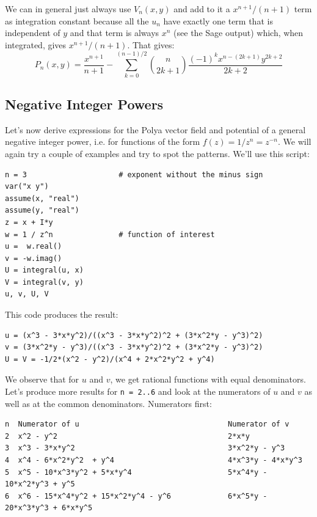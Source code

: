 \documentclass[12pt]{article}
\begin{document}
\medskip
We can in general just always use $V_n(x,y)$ and add to it a $x^{n+1}/(n+1)$ term as integration constant because all the $u_n$ have exactly one term that is independent of $y$ and that term is always $x^n$ (see the Sage output) which, when integrated, gives $x^{n+1}/(n+1)$. That gives:
\begin{equation}
\label{Eq:PolyaPotentialPositivePowers}	
\boxed{	
	P_n(x,y) = \frac{x^{n+1}}{n+1} 
	-\sum_{k=0}^{(n-1)/2} \binom{n}{2k+1} \frac{(-1)^k x^{n-(2k+1)} y^{2k+2}}{2k+2}
}
\end{equation}

\subsection{Negative Integer Powers}
Let's now derive expressions for the Polya vector field and potential of a general negative integer power, i.e. for functions of the form $f(z) = 1/z^n = z^{-n}$. We will again try a couple of examples and try to spot the patterns. We'll use this script:
\begin{verbatim}
n = 3                     # exponent without the minus sign
var("x y")
assume(x, "real")
assume(y, "real")
z = x + I*y
w = 1 / z^n               # function of interest
u =  w.real() 
v = -w.imag()
U = integral(u, x)
V = integral(v, y)
u, v, U, V
\end{verbatim}
This code produces the result:
\begin{verbatim}
u = (x^3 - 3*x*y^2)/((x^3 - 3*x*y^2)^2 + (3*x^2*y - y^3)^2)
v = (3*x^2*y - y^3)/((x^3 - 3*x*y^2)^2 + (3*x^2*y - y^3)^2)
U = V = -1/2*(x^2 - y^2)/(x^4 + 2*x^2*y^2 + y^4)
\end{verbatim}
We observe that for $u$ and $v$, we get rational functions with equal denominators. Let's produce more results for \texttt{n = 2..6} and look at the numerators of $u$ and $v$ as well as at the common denominators. Numerators first:
\begin{verbatim}
n  Numerator of u                                  Numerator of v
2  x^2 - y^2                                       2*x*y                         
3  x^3 - 3*x*y^2                                   3*x^2*y - y^3                  
4  x^4 - 6*x^2*y^2  + y^4                          4*x^3*y - 4*x*y^3
5  x^5 - 10*x^3*y^2 + 5*x*y^4                      5*x^4*y - 10*x^2*y^3 + y^5
6  x^6 - 15*x^4*y^2 + 15*x^2*y^4 - y^6             6*x^5*y - 20*x^3*y^3 + 6*x*y^5
\end{verbatim}
\end{document}
